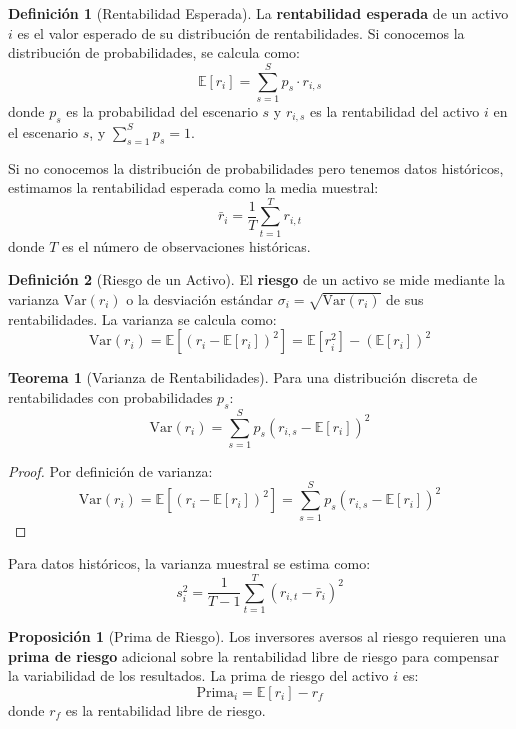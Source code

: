 \documentclass[12pt,a4paper]{article}
\theoremstyle{definition}
\newtheorem{definicion}{Definición}[section]
\newtheorem{teorema}{Teorema}[section]
\newtheorem{proposicion}{Proposición}[section]
\newcommand{\E}{\mathbb{E}}
\newcommand{\Var}{\text{Var}}
\begin{document}
\begin{definicion}[Rentabilidad Esperada]
La \textbf{rentabilidad esperada} de un activo $i$ es el valor esperado de su distribución de rentabilidades. Si conocemos la distribución de probabilidades, se calcula como:
\begin{equation}
\E[r_i] = \sum_{s=1}^{S} p_s \cdot r_{i,s}
\end{equation}
donde $p_s$ es la probabilidad del escenario $s$ y $r_{i,s}$ es la rentabilidad del activo $i$ en el escenario $s$, y $\sum_{s=1}^{S} p_s = 1$.
\end{definicion}

Si no conocemos la distribución de probabilidades pero tenemos datos históricos, estimamos la rentabilidad esperada como la media muestral:
\begin{equation}
\bar{r}_i = \frac{1}{T} \sum_{t=1}^{T} r_{i,t}
\end{equation}
donde $T$ es el número de observaciones históricas.

\begin{definicion}[Riesgo de un Activo]
El \textbf{riesgo} de un activo se mide mediante la varianza $\Var(r_i)$ o la desviación estándar $\sigma_i = \sqrt{\Var(r_i)}$ de sus rentabilidades. La varianza se calcula como:
\begin{equation}
\Var(r_i) = \E[(r_i - \E[r_i])^2] = \E[r_i^2] - (\E[r_i])^2
\end{equation}
\end{definicion}

\begin{teorema}[Varianza de Rentabilidades]
Para una distribución discreta de rentabilidades con probabilidades $p_s$:
\begin{equation}
\Var(r_i) = \sum_{s=1}^{S} p_s (r_{i,s} - \E[r_i])^2
\end{equation}
\end{teorema}

\begin{proof}
Por definición de varianza:
$$\Var(r_i) = \E[(r_i - \E[r_i])^2] = \sum_{s=1}^{S} p_s (r_{i,s} - \E[r_i])^2$$
\end{proof}

Para datos históricos, la varianza muestral se estima como:
\begin{equation}
s_i^2 = \frac{1}{T-1} \sum_{t=1}^{T} (r_{i,t} - \bar{r}_i)^2
\end{equation}

\begin{proposicion}[Prima de Riesgo]
Los inversores aversos al riesgo requieren una \textbf{prima de riesgo} adicional sobre la rentabilidad libre de riesgo para compensar la variabilidad de los resultados. La prima de riesgo del activo $i$ es:
\begin{equation}
\text{Prima}_i = \E[r_i] - r_f
\end{equation}
donde $r_f$ es la rentabilidad libre de riesgo.
\end{proposicion}
\end{document}
